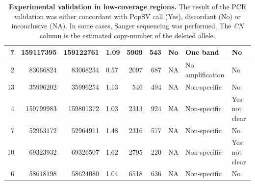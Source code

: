 \begin{table}[htp]
{\begin{tabular}{|r|r|r|l|r|r|l|l|l|}
      \hline
      7 & 159117395 & 159122761 & 1.09 & 5909 & 543 & No & One band & No\\
      \hline
      2 & 83066824 & 83068234 & 0.57 & 2097 & 687 & NA & No amplification & No\\
      \hline
      13 & 35996202 & 35996254 & 1.13 & 546 & 494 & NA & Non-specific & No\\
      \hline
      4 & 159799983 & 159801372 & 1.03 & 2313 & 924 & NA & Non-specific & Yes: not clear\\
      \hline
      7 & 52963172 & 52964911 & 1.48 & 2316 & 577 & NA & Non-specific & No\\
      \hline
      10 & 69323932 & 69326507 & 1.62 & 2795 & 220 & NA & Non-specific & Yes: not clear\\
      \hline
      6 & 58618198 & 58624080 & 1.04 & 6518 & 636 & NA & Non-specific & No\\
      \hline
    \end{tabular}
  }
  \caption[Experimental validation in low-coverage regions.]{{\bf Experimental validation in low-coverage regions.} {\small The result of the PCR validation was either concordant with {\sf PopSV} call (Yes), discordant (No) or inconclusive (NA). In some cases, Sanger sequencing was performed. The {\it CN} column is the estimated copy-number of the deleted allele.}}
  \label{tab:pcr2}
\end{table}

